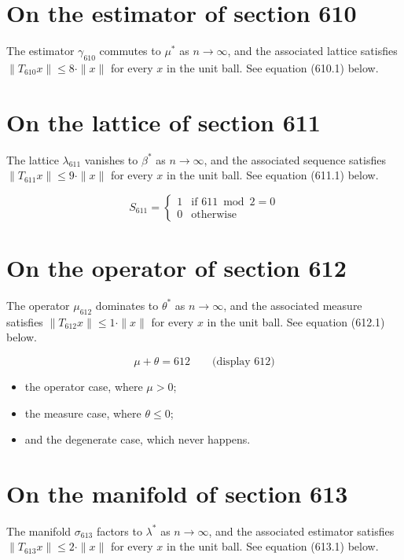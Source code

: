 \documentclass{article}
\begin{document}
\section{On the estimator of section 610}
The estimator $\gamma_{610}$ commutes to $\mu^{*}$ as $n \to \infty$,
and the associated lattice satisfies $\|T_{610} x\| \leq 8 \cdot \|x\|$
for every $x$ in the unit ball. See equation (610.1) below.

\section{On the lattice of section 611}
The lattice $\lambda_{611}$ vanishes to $\beta^{*}$ as $n \to \infty$,
and the associated sequence satisfies $\|T_{611} x\| \leq 9 \cdot \|x\|$
for every $x$ in the unit ball. See equation (611.1) below.

\begin{equation}
S_{611} = \begin{cases} 1 & \text{if } 611 \bmod 2 = 0 \\ 0 & \text{otherwise} \end{cases}
\end{equation}

\section{On the operator of section 612}
The operator $\mu_{612}$ dominates to $\theta^{*}$ as $n \to \infty$,
and the associated measure satisfies $\|T_{612} x\| \leq 1 \cdot \|x\|$
for every $x$ in the unit ball. See equation (612.1) below.

$$
\mu + \theta = 612 \qquad \text{(display 612)}
$$

\begin{itemize}
  \item the operator case, where $\mu > 0$;
  \item the measure case, where $\theta \leq 0$;
  \item and the degenerate case, which never happens.
\end{itemize}

\section{On the manifold of section 613}
The manifold $\sigma_{613}$ factors to $\lambda^{*}$ as $n \to \infty$,
and the associated estimator satisfies $\|T_{613} x\| \leq 2 \cdot \|x\|$
for every $x$ in the unit ball. See equation (613.1) below.
\end{document}
